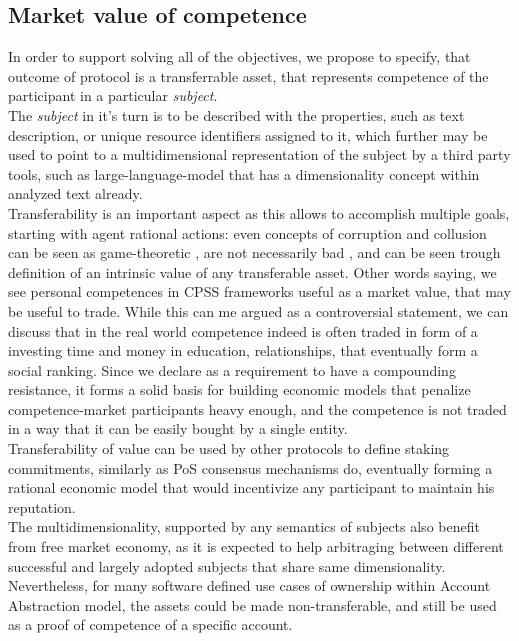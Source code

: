 \documentclass{article}
\begin{document}
\begin{CJK}{UTF8}{gbsn}
\begin{multicols}{2}
        \subsection{Market value of competence}
        In order to support solving all of the objectives, we propose to specify, that outcome of protocol is a transferrable asset, that represents competence of the participant in a particular \textit{subject}. \\
        The \textit{subject} in it's turn is to be described with the properties, such as text description, or unique resource identifiers assigned to it, which further may be used to point to a multidimensional representation of the subject by a third party tools, such as large-language-model that has a dimensionality concept within analyzed text already. \\
        Transferability is an important aspect as this allows to accomplish multiple goals, starting with agent rational actions: even concepts of corruption and collusion can be seen as game-theoretic \cite{Macrae1982}, are not necessarily bad \cite{Leff1964}, and can be seen trough definition of an intrinsic value of any transferable asset. Other words saying, we see personal competences in CPSS frameworks useful as a market value, that may be useful to trade. While this can me argued as a controversial statement, we can discuss that in the real world competence indeed is often traded in form of a investing time and money in education, relationships, that eventually form a social ranking. Since we declare as a requirement to have a compounding resistance, it forms a solid basis for building economic models that penalize competence-market participants heavy enough,  and the competence is not traded in a way that it can be easily bought by a single entity.\\ Transferability of value can be used by other protocols to define staking commitments, similarly as PoS consensus mechanisms do, eventually forming a rational economic model that would incentivize any participant to maintain his reputation.\\
        The multidimensionality, supported by any semantics of subjects also benefit from free market economy, as it is expected to help arbitraging between different successful and largely adopted subjects that share same dimensionality. Nevertheless, for many software defined use cases of ownership within Account Abstraction\cite{Qin2023} model, the assets could be made non-transferable, and still be used as a proof of competence of a specific account.\\

\end{multicols}
\end{CJK}
\end{document}
